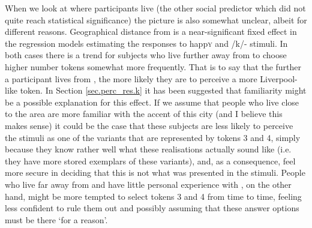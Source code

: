 When we look at where participants live (the other social predictor which did not quite reach statistical significance) the picture is also somewhat unclear, albeit for different reasons.
Geographical distance from  is a near-significant fixed effect in the regression models estimating the responses to happ\textsc{y} and /k/- stimuli.
In both cases there is a trend for subjects who live further away from  to choose higher number tokens somewhat more frequently.
That is to say that the further a participant lives from , the more likely they are to perceive a more Liverpool-like token.
In Section \ref{sec.perc_res.k} it has been suggested that familiarity might be a possible explanation for this effect.
If we assume that people who live close to the  area are more familiar with the accent of this city (and I believe this makes sense) it could be the case that these subjects are less likely to perceive the stimuli as one of the  variants that are represented by tokens 3 and 4, simply because they know rather well what these realisations actually sound like (i.e. they have more stored exemplars of these variants), and, as a consequence, feel more secure in deciding that this is not what was presented in the stimuli.
People who live far away from  and have little personal experience with , on the other hand, might be more tempted to select tokens 3 and 4 from time to time, feeling less confident to rule them out and possibly assuming that these answer options must be there `for a reason'.


